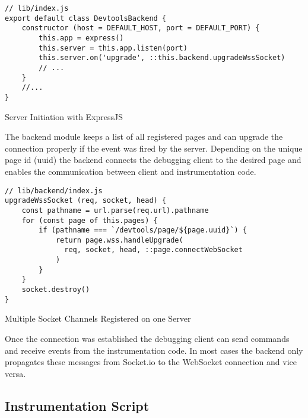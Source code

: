 \begin{listing}[H]
\begin{verbatim}
// lib/index.js
export default class DevtoolsBackend {
    constructor (host = DEFAULT_HOST, port = DEFAULT_PORT) {
        this.app = express()
        this.server = this.app.listen(port)
        this.server.on('upgrade', ::this.backend.upgradeWssSocket)
        // ...
    }
    //...
}
\end{verbatim}
\caption{Server Initiation with ExpressJS}
\label{lst:socketUpgrade}
\end{listing}

The backend module keeps a list of all registered pages and can upgrade the connection properly if
the event was fired by the server. Depending on the unique page id (uuid) the backend connects the
debugging client to the desired page and enables the communication between client and instrumentation
code.

\begin{listing}[H]
\begin{verbatim}
// lib/backend/index.js
upgradeWssSocket (req, socket, head) {
    const pathname = url.parse(req.url).pathname
    for (const page of this.pages) {
        if (pathname === `/devtools/page/${page.uuid}`) {
            return page.wss.handleUpgrade(
              req, socket, head, ::page.connectWebSocket
            )
        }
    }
    socket.destroy()
}
\end{verbatim}
\caption{Multiple Socket Channels Registered on one Server}
\label{lst:socket}
\end{listing}

Once the connection was established the debugging client can send commands and receive events from
the instrumentation code. In most cases the backend only propagates these messages from Socket.io
to the WebSocket connection and vice versa.

\subsection{Instrumentation Script}

